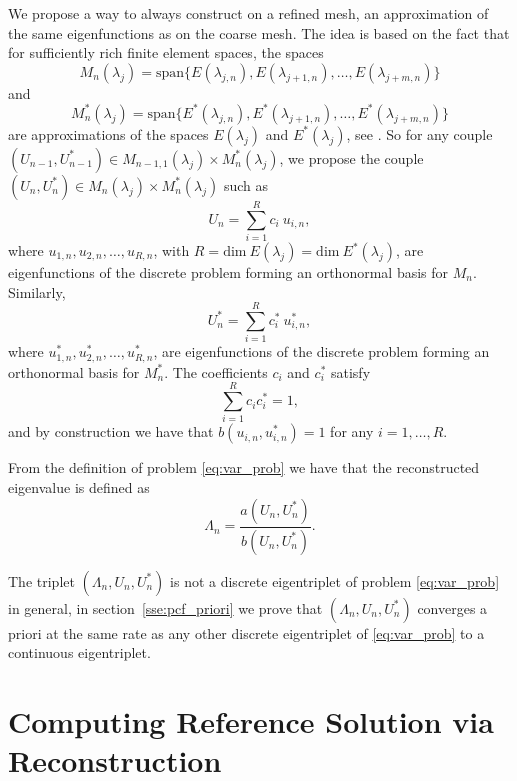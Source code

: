 \documentclass[smallextended]{svjour3}
\begin{document}
We propose a way to always construct on a refined mesh, an approximation of the same eigenfunctions as on the coarse mesh. The idea is based on the fact that for sufficiently rich finite element spaces, the spaces
$$
M_n(\lambda_j)=\mathrm{span}\{E(\lambda_{j,n}),E(\lambda_{j+1,n}),\dots, E(\lambda_{j+m,n})\}
$$ 
and 
$$
M_n^*(\lambda_j)=\mathrm{span}\{E^*(\lambda_{j,n}),E^*(\lambda_{j+1,n}),\dots, E^*(\lambda_{j+m,n})\}
$$ 
are approximations of the spaces $E(\lambda_j)$ and $E^*(\lambda_j)$, see \cite{babuska}. 
So for any couple $(U_{n-1},U_{n-1}^*)\in M_{n-1,1}(\lambda_j)\times M_{n}^*(\lambda_j)$, we propose the couple $(U_{n},U_{n}^*)\in M_{n}(\lambda_j)\times M_{n}^*(\lambda_j)$ such as
\begin{equation}\label{eq:const}
U_n=\sum_{i=1}^{R} c_i \ u_{i,n},
\end{equation}
where $u_{1,n},u_{2,n},\dots,u_{R,n}$, with $R=\mathrm{dim}\ E(\lambda_j)=\mathrm{dim}\ E^*(\lambda_j)$, are eigenfunctions of the discrete problem forming  an orthonormal basis for
$M_{n}$.
Similarly,
\begin{equation}\label{eq:const_star}
U_n^*=\sum_{i=1}^{R} c_i^* \ u_{i,n}^*,
\end{equation}
where $u_{1,n}^*,u_{2,n}^*,\dots,u_{R,n}^*$, are eigenfunctions of the discrete problem forming  an orthonormal basis for
$M_{n}^*$.
 The coefficients $c_i$ and $c_i^*$ satisfy 
\begin{equation}\label{eq:cond_on_corf}
\sum_{i=1}^{R} c_ic_i^*=1,
\end{equation}
and by construction we have that $b(u_{i,n},u_{i,n}^*)=1$ for any $i=1,\dots,R$.

From the definition of problem \eqref{eq:var_prob} we have that the reconstructed eigenvalue is defined as
$$
\Lambda_n=\frac{a(U_n,U_n^*)}{b(U_n,U_n^*)}.
$$

The triplet $(\Lambda_n,U_n,U_n^*)$ is not a discrete eigentriplet of problem \eqref{eq:var_prob} in general, in section~\ref{sse:pcf_priori} we prove that $(\Lambda_n,U_n,U_n^*)$ converges a priori at the same rate as any other discrete eigentriplet of \eqref{eq:var_prob} to a continuous eigentriplet.

\section{Computing Reference Solution via Reconstruction}\label{sec:recoref}
\end{document}
